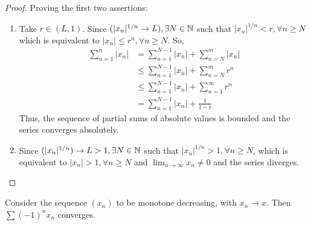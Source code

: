 \begin{proof}
    Proving the first two assertions:
    \begin{enumerate}
        \item Take $r \in (L, 1)$. Since $(|x_n|^{1/n} \to L), \exists N \in \mathbb{N}$ such that $|x_n|^{1/n} < r, \forall n \geq N$ which is equivalent to $|x_n| \leq r^n, \forall n \geq N$. So,
        \begin{align*}
            \sum \limits_{n=1}^n|x_n| &= \sum \limits_{n=1}^{N-1}|x_n| + \sum \limits_{n=N}^{m}|x_n| \\
            &\leq \sum \limits_{n=1}^{N-1}|x_n| + \sum \limits_{n=N}^{m}r^n \\
            &\leq \sum \limits_{n=1}^{N-1}|x_n| + \sum \limits_{n=1}^{\infty}r^n \\
            &= \sum \limits_{n=1}^{N-1}|x_n| + \frac{1}{1-r}
        \end{align*}
        Thus, the sequence of partial sums of absolute values is bounded and the series converges absolutely.
        \item Since $(|x_n|^{1/n}) \to L > 1, \exists N \in \mathbb{N}$ such that $|x_n|^{1/n} > 1, \forall n \geq N$, which is equivalent to $|x_n| > 1, \forall n \geq N$ and $\lim_{n \to \infty} x_n \neq 0$ and the series diverges.
    \end{enumerate}
\end{proof}

\begin{theorem}
    Consider the sequence $(x_n)$ to be monotone decreasing, with $x_n \to x$. Then $\sum (-1)^n x_n$ converges.
\end{theorem}

